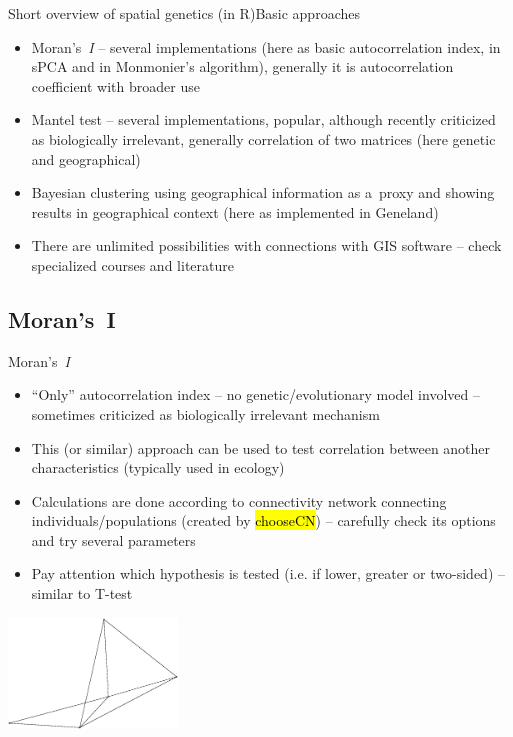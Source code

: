 \documentclass[compress, ucs, xelatex, 11pt, xcolor=svgnames,
  hyperref={
    bookmarks=true,
    unicode=true,
    colorlinks=true,
    pdftitle={Molecular data in R},
    plainpages=false,
    pdfauthor={Vojtech Zeisek},
    pdfsubject={Course about phylogeny and evolution in R},
    pdfcreator={XeLaTeX},
    pdfkeywords={R, evolution, phylogeny, molecular data},
    linkcolor=Tomato,
    anchorcolor=SaddleBrown,
    citecolor=Goldenrod,
    filecolor=DarkMagenta,
    menucolor=Sienna,
    urlcolor=DarkTurquoise,
    pdftex},
  url={hyphens, lowtilde} %
  ]{beamer}
\renewcommand{\texttt}[1]{\hl{\ttfamily #1}}
\begin{document}
\begin{frame}{Short overview of spatial genetics (in R)}{Basic approaches}
  \begin{itemize}
    \item Moran's~\textit{I} -- several implementations (here as basic autocorrelation index, in sPCA and in Monmonier's algorithm), generally it is autocorrelation coefficient with broader use
    \item Mantel test -- several implementations, popular, although recently criticized as biologically irrelevant, generally correlation of two matrices (here genetic and geographical)
    \item Bayesian clustering using geographical information as a~proxy and showing results in geographical context (here as implemented in Geneland)
    \item There are unlimited possibilities with connections with GIS software -- check specialized courses and literature
  \end{itemize}
\end{frame}

\subsection{Moran's~I}

\begin{frame}{Moran's~\textit{I}}
  \begin{multicols}{2}
    \begin{itemize}
      \item ``Only'' autocorrelation index -- no genetic/evolutionary model involved -- sometimes criticized as biologically irrelevant mechanism
      \item This (or similar) approach can be used to test correlation between another characteristics (typically used in ecology)
      \item Calculations are done according to connectivity network connecting individuals/populations (created by \texttt{chooseCN}) -- carefully check its options and try several parameters
      \item Pay attention which hypothesis is tested (i.e. if lower, greater or two-sided) -- similar to T-test
    \end{itemize}
    \begin{center}
      \includegraphics[width=4.5cm]{choosecn.png}
    \end{center}
  \end{multicols}
\end{frame}
\end{document}
